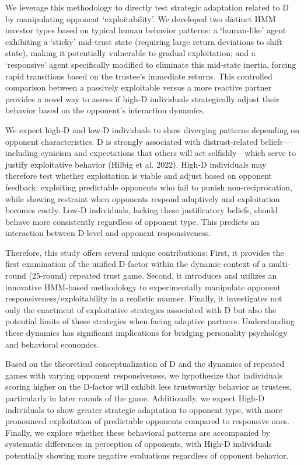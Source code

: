 \documentclass[
]{article}
\begin{document}
We leverage this methodology to directly test strategic adaptation related to D by manipulating opponent `exploitability'.
We developed two distinct HMM investor types based on typical human behavior patterns: a `human-like' agent exhibiting a `sticky' mid-trust state (requiring large return deviations to shift state), making it potentially vulnerable to gradual exploitation; and a `responsive' agent specifically modified to eliminate this mid-state inertia, forcing rapid transitions based on the trustee's immediate returns.
This controlled comparison between a passively exploitable versus a more reactive partner provides a novel way to assess if high-D individuals strategically adjust their behavior based on the opponent's interaction dynamics.

We expect high-D and low-D individuals to show diverging patterns depending on opponent characteristics. D is strongly associated with distrust-related beliefs---including cynicism and expectations that others will act selfishly---which serve to justify exploitative behavior (Hilbig et al. 2022). High-D individuals may therefore test whether exploitation is viable and adjust based on opponent feedback: exploiting predictable opponents who fail to punish non-reciprocation, while showing restraint when opponents respond adaptively and exploitation becomes costly. Low-D individuals, lacking these justificatory beliefs, should behave more consistently regardless of opponent type. This predicts an interaction between D-level and opponent responsiveness.

Therefore, this study offers several unique contributions: First, it provides the first examination of the unified D-factor within the dynamic context of a multi-round (25-round) repeated trust game.
Second, it introduces and utilizes an innovative HMM-based methodology to experimentally manipulate opponent responsiveness/exploitability in a realistic manner.
Finally, it investigates not only the enactment of exploitative strategies associated with D but also the potential limits of these strategies when facing adaptive partners.
Understanding these dynamics has significant implications for bridging personality psychology and behavioral economics.

Based on the theoretical conceptualization of D and the dynamics of repeated games with varying opponent responsiveness, we hypothesize that individuals scoring higher on the D-factor will exhibit less trustworthy behavior as trustees, particularly in later rounds of the game.
Additionally, we expect High-D individuals to show greater strategic adaptation to opponent type, with more pronounced exploitation of predictable opponents compared to responsive ones.
Finally, we explore whether these behavioral patterns are accompanied by systematic differences in perception of opponents, with High-D individuals potentially showing more negative evaluations regardless of opponent behavior.
\end{document}
